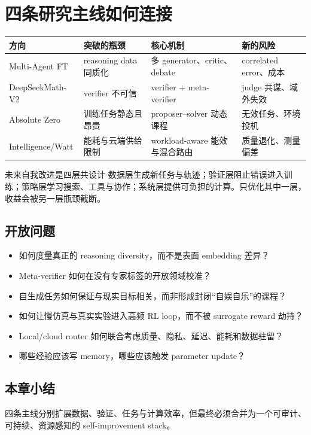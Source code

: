\section{四条研究主线如何连接}

\begin{table}[H]
\centering
\small
\begin{tabular}{>{\raggedright\arraybackslash}p{3cm}>{\raggedright\arraybackslash}p{3.4cm}>{\raggedright\arraybackslash}p{3.7cm}>{\raggedright\arraybackslash}p{3.4cm}}
\toprule
\textbf{方向} & \textbf{突破的瓶颈} & \textbf{核心机制} & \textbf{新的风险} \\
\midrule
Multi-Agent FT & reasoning data 同质化 & 多 generator、critic、debate & correlated error、成本 \\
DeepSeekMath-V2 & verifier 不可信 & verifier + meta-verifier & judge 共谋、域外失效 \\
Absolute Zero & 训练任务静态且昂贵 & proposer--solver 动态课程 & 无效任务、环境投机 \\
Intelligence/Watt & 能耗与云端供给限制 & workload-aware 能效与混合路由 & 质量退化、测量偏差 \\
\bottomrule
\end{tabular}
\end{table}

\begin{importantbox}{未来自我改进是四层共设计}
数据层生成新任务与轨迹；验证层阻止错误进入训练；策略层学习搜索、工具与协作；系统层提供可负担的计算。只优化其中一层，收益会被另一层瓶颈截断。
\end{importantbox}

\subsection{开放问题}

\begin{itemize}
    \item 如何度量真正的 reasoning diversity，而不是表面 embedding 差异？
    \item Meta-verifier 如何在没有专家标签的开放领域校准？
    \item 自生成任务如何保证与现实目标相关，而非形成封闭“自娱自乐”的课程？
    \item 如何让慢仿真与真实实验进入高频 RL loop，而不被 surrogate reward 劫持？
    \item Local/cloud router 如何联合考虑质量、隐私、延迟、能耗和数据驻留？
    \item 哪些经验应该写 memory，哪些应该触发 parameter update？
\end{itemize}

\subsection{本章小结}

四条主线分别扩展数据、验证、任务与计算效率，但最终必须合并为一个可审计、可持续、资源感知的 self-improvement stack。

